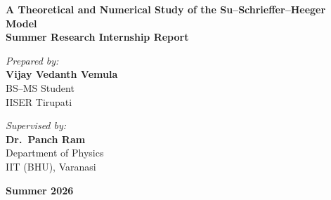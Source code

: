 \documentclass[11pt, a4paper]{article}
\begin{document}
\pagestyle{fancy}


\begin{titlepage}
    \centering        
    {\Huge \textbf{A Theoretical and Numerical Study of the Su–Schrieffer–Heeger Model}}\\[1.5cm]
    
    {\Large \textbf{Summer Research Internship Report}}\\[3cm]
    
    \vfill
    \begin{minipage}{0.45\textwidth}
        \begin{flushleft} \large
            \emph{Prepared by:}\\[0.2cm]
            \textbf{Vijay Vedanth Vemula}\\
            BS--MS Student\\
            IISER Tirupati
        \end{flushleft}
    \end{minipage}
    \hfill
    \begin{minipage}{0.45\textwidth}
        \begin{flushright} \large
            \emph{Supervised by:}\\[0.2cm]
            \textbf{Dr.~Panch Ram}\\
            Department of Physics\\
            IIT (BHU), Varanasi
        \end{flushright}
    \end{minipage}
    
    \vfill
    
    {\large \textbf{Summer 2026}}\\[1cm]
\end{titlepage}

\clearpage
\hypersetup{pageanchor=false}

\setcounter{page}{1}

\tableofcontents

\clearpage
\hypersetup{pageanchor=true}

\setcounter{page}{1}
\pagestyle{fancy}
\end{document}

